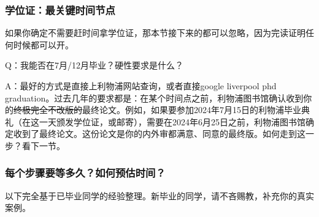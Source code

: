 \subsubsection{学位证：最关键时间节点}

如果你确定不需要赶时间拿学位证，那本节接下来的都可以忽略，因为完读证明任何时候都可以开。

Q：我能否在7月/12月毕业？硬性要求是什么？

A：最好的方式是直接上利物浦网站查询，或者直接google liverpool phd graduation。过去几年的要求都是：在某个时间点之前，利物浦图书馆确认收到你的\sout{终极完全不改版的}最终论文。例如，如果要参加2024年7月15日的利物浦毕业典礼（在这一天颁发学位证，或邮寄），需要在2024年6月25日之前，利物浦图书馆确定收到了最终论文。这份论文是你的内外审都满意、同意的最终版。如何走到这一步？看下一节。

\subsubsection{每个步骤要等多久？如何预估时间？}
\label{sec.graduation.time}

以下完全基于已毕业同学的经验整理。新毕业的同学，请不吝赐教，补充你的真实案例。

